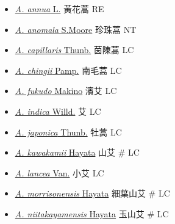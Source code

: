 \begin{itemize}
  \begin{itemize}
        \item[] \href{http://www.theplantlist.org/tpl1.1/search?q=Artemisia+annua}{\textit{A. annua} L.}   黃花蒿   RE
        \item[] \href{http://www.theplantlist.org/tpl1.1/search?q=Artemisia+anomala}{\textit{A. anomala} S.Moore}   珍珠蒿   NT
        \item[] \href{http://www.theplantlist.org/tpl1.1/search?q=Artemisia+capillaris}{\textit{A. capillaris} Thunb.}   茵陳蒿   LC
        \item[] \href{http://www.theplantlist.org/tpl1.1/search?q=Artemisia+chingii}{\textit{A. chingii} Pamp.}   南毛蒿   LC
        \item[] \href{http://www.theplantlist.org/tpl1.1/search?q=Artemisia+fukudo}{\textit{A. fukudo} Makino}   濱艾   LC
        \item[] \href{http://www.theplantlist.org/tpl1.1/search?q=Artemisia+indica}{\textit{A. indica} Willd.}   艾   LC
        \item[] \href{http://www.theplantlist.org/tpl1.1/search?q=Artemisia+japonica}{\textit{A. japonica} Thunb.}   牡蒿   LC
        \item[] \href{http://www.theplantlist.org/tpl1.1/search?q=Artemisia+kawakamii}{\textit{A. kawakamii} Hayata}   山艾  \# LC
        \item[] \href{http://www.theplantlist.org/tpl1.1/search?q=Artemisia+lancea}{\textit{A. lancea} Van.}   小艾   LC
        \item[] \href{http://www.theplantlist.org/tpl1.1/search?q=Artemisia+morrisonensis}{\textit{A. morrisonensis} Hayata}   細葉山艾  \# LC
        \item[] \href{http://www.theplantlist.org/tpl1.1/search?q=Artemisia+niitakayamensis}{\textit{A. niitakayamensis} Hayata}   玉山艾  \# LC

\end{itemize}
\end{itemize}
